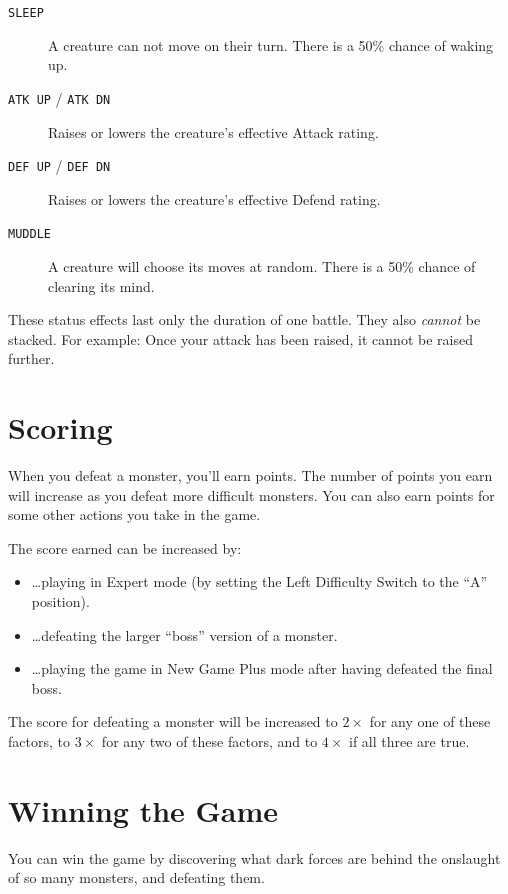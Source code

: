 \documentclass[10pt,twocolumn,openany,article]{memoir}
\begin{document}
\begin{description}
\item[\texttt{SLEEP}] A  creature can not  move on their turn.  There is
  a 50\% chance of waking up.
\item[\texttt{ATK UP} / \texttt{ATK DN}] Raises or lowers the creature's
  effective Attack rating.
\item[\texttt{DEF UP} / \texttt{DEF DN}] Raises or lowers the creature's
  effective Defend rating.
\item[\texttt{MUDDLE}]  A  creature will  choose  its  moves at  random.
  There is a 50\% chance of clearing its mind.
\end{description}

These status  effects last only  the duration  of one battle.  They also
\emph{cannot} be stacked. For example: Once your attack has been raised,
it cannot be raised further.

\section{Scoring}

When you defeat a monster, you'll  earn points. The number of points you
earn will increase  as you defeat more difficult monsters.  You can also
earn points for some other actions you take in the game.

The score earned can be increased by:

\begin{itemize}
\item \ldots{}playing  in Expert  mode (by  setting the  Left Difficulty
  Switch to the ``A'' position).
\item \ldots{}defeating the larger ``boss'' version of a monster.
\item  \ldots{}playing the  game  in  New Game  Plus  mode after  having
  defeated the final boss.
\end{itemize}

The score for  defeating a monster will be increased  to $2\times$ for any
one of these  factors, to $3\times$ for  any two of these  factors, and to
$4\times$ if all three are true.

\section{Winning the Game}

You can  win the  game by  discovering what dark  forces are  behind the
onslaught of so many monsters, and defeating them.
\end{document}
